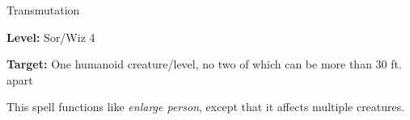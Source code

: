 
Transmutation

\textbf{Level:} Sor/Wiz 4

\textbf{Target:} One humanoid creature/level, no two of which can be more than 
30 ft. apart

This spell functions like \textit{enlarge person}, except that it affects multiple 
creatures.

